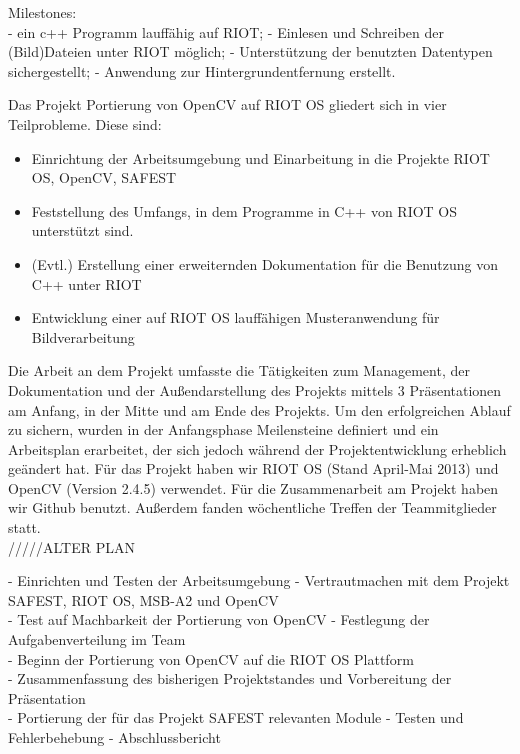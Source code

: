 \documentclass[10pt,a4paper]{article}
\begin{document}
Milestones: \\
- ein c++ Programm lauffähig auf RIOT; \newline
- Einlesen und Schreiben der (Bild)Dateien unter RIOT möglich; \newline
- Unterstützung der benutzten Datentypen sichergestellt; \newline
- Anwendung zur Hintergrundentfernung erstellt. \newline


Das Projekt Portierung von OpenCV auf RIOT OS gliedert sich in vier Teilprobleme. Diese sind:
\begin{itemize}
\item Einrichtung der Arbeitsumgebung und Einarbeitung in die Projekte RIOT OS, OpenCV, SAFEST
\item Feststellung des Umfangs, in dem Programme in C++ von RIOT OS unterstützt sind.
\item (Evtl.) Erstellung einer erweiternden Dokumentation für die Benutzung von C++ unter RIOT
\item Entwicklung einer auf RIOT OS lauffähigen Musteranwendung für Bildverarbeitung
\end{itemize}

Die Arbeit an dem Projekt umfasste die Tätigkeiten zum Management, der Dokumentation und der Außendarstellung des Projekts mittels 3 Präsentationen am Anfang, in der Mitte und am Ende des Projekts. Um den erfolgreichen Ablauf zu sichern, wurden in der Anfangsphase Meilensteine definiert und ein Arbeitsplan erarbeitet, der sich jedoch während der Projektentwicklung erheblich geändert hat. Für das Projekt haben wir RIOT OS (Stand April-Mai 2013) und OpenCV (Version 2.4.5) verwendet. Für die Zusammenarbeit am Projekt haben wir Github benutzt. Außerdem fanden wöchentliche Treffen der Teammitglieder statt. \\

/////ALTER PLAN

- Einrichten und Testen der Arbeitsumgebung \newline
- Vertrautmachen mit dem Projekt SAFEST, RIOT OS, MSB-A2 und OpenCV \\
- Test auf Machbarkeit der Portierung von OpenCV \newline
- Festlegung der Aufgabenverteilung im Team \\
- Beginn der Portierung von OpenCV auf die RIOT OS Plattform \\
- Zusammenfassung des bisherigen Projektstandes und Vorbereitung der Präsentation \\
- Portierung der für das Projekt SAFEST relevanten Module \newline
- Testen und Fehlerbehebung \newline
- Abschlussbericht \\ 
\end{document}
